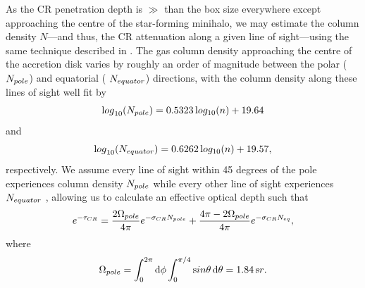 \documentclass[../thesis.tex]{subfiles}
\begin{document}
As the CR penetration depth is $\gg$ than the box size everywhere except approaching the centre of the star-forming minihalo, we may estimate the column density $N$---and thus, the CR attenuation along a given line of sight---using the same technique described in \citet{Hummeletal2015}. 
The gas column density approaching the centre of the accretion disk varies by roughly an order of magnitude between the polar ($N_{\mathrm \small pole}$) and equatorial ( $N_{\mathrm \small equator}$) directions, with the column density  along these lines of sight well fit by
\begin{equation}
{\mathrm log}_{10}(N_{\mathrm \small pole}) = 0.5323\, {\mathrm log_{10}}(n) + 19.64
\end{equation}
and
\begin{equation}
{\mathrm log}_{10}(N_{\mathrm \small equator}) = 0.6262\, {\mathrm log_{10}}(n) + 19.57, 
\end{equation}
respectively. We assume every line of sight within 45 degrees of the pole experiences column density $N_{\mathrm \small pole}$ while every other line of sight experiences $N_{\mathrm \small equator}$ \citep{Hosokawaetal2011}, allowing us to calculate an effective optical depth such that
\begin{equation}
e^{-\tau_{\mathrm \small CR}} = \frac{2 \Omega_{\mathrm \small pole}}{4\pi} e^{-\sigma_{\mathrm \small CR} N_{\mathrm \small pole}} + \frac{4\pi - 2 \Omega_{\mathrm \small pole}}{4\pi} e^{-\sigma_{\mathrm \small CR} N_{\mathrm \small eq}},
\end{equation}
where
\begin{equation}
\Omega_{\mathrm \small pole} = \int_0^{2\pi}{\mathrm d}\phi \int_0^{\pi/4}{\mathrm sin}\theta \,{\mathrm d}\theta = 1.84\,{\mathrm sr}.
\end{equation}
\end{document}

